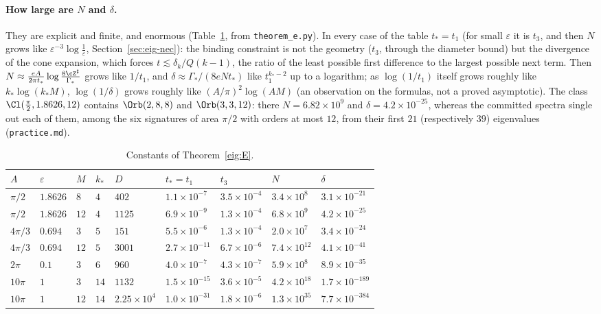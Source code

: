 \paragraph{How large are $N$ and $\delta$.} They are explicit and finite, and enormous (Table~\ref{eig:tab:E}, from \texttt{theorem\_e.py}). In every case of the table $t_*=t_1$ (for small $\varepsilon$ it is $t_3$, and then $N$ grows like $\varepsilon^{-3}\log\frac1\varepsilon$, Section~\ref{sec:eig-nec}): the binding constraint is not the geometry ($t_3$, through the diameter bound) but the divergence of the cone expansion, which forces $t\lesssim\delta_k/Q(k-1)$, the ratio of the least possible first difference to the largest possible next term. Then $N\approx\frac{eA}{2\pi t_*}\log\frac{8\cZ^\sharp}{\Gamma_*}$ grows like $1/t_1$, and $\delta\approx\Gamma_*/(8eNt_*)$ like $t_1^{k_*-2}$ up to a logarithm; as $\log(1/t_1)$ itself grows roughly like $k_*\log(k_*M)$, $\log(1/\delta)$ grows roughly like $(A/\pi)^2\log(AM)$ (an observation on the formulas, not a proved asymptotic). The class $\Cl(\frac\pi2,1.8626,12)$ contains $\Orb(2,8,8)$ and $\Orb(3,3,12)$: there $N=6.82\times10^9$ and $\delta=4.2\times10^{-25}$, whereas the committed spectra single out each of them, among the six signatures of area $\pi/2$ with orders at most $12$, from their first $21$ (respectively $39$) eigenvalues (\texttt{practice.md}).

\begin{table}[h]
\centering\footnotesize
\caption{Constants of Theorem~\ref{eig:E}.}\label{eig:tab:E}
\begin{tabular}{@{}lllllllll@{}}
\toprule
$A$ & $\varepsilon$ & $M$ & $k_*$ & $D$ & $t_*=t_1$ & $t_3$ & $N$ & $\delta$\\
\midrule
$\pi/2$ & $1.8626$ & $8$ & $4$ & $402$ & $1.1\times10^{-7}$ & $3.5\times10^{-4}$ & $3.4\times10^{8}$ & $3.1\times10^{-21}$\\
$\pi/2$ & $1.8626$ & $12$ & $4$ & $1125$ & $6.9\times10^{-9}$ & $1.3\times10^{-4}$ & $6.8\times10^{9}$ & $4.2\times10^{-25}$\\
$4\pi/3$ & $0.694$ & $3$ & $5$ & $151$ & $5.5\times10^{-6}$ & $1.3\times10^{-4}$ & $2.0\times10^{7}$ & $3.4\times10^{-24}$\\
$4\pi/3$ & $0.694$ & $12$ & $5$ & $3001$ & $2.7\times10^{-11}$ & $6.7\times10^{-6}$ & $7.4\times10^{12}$ & $4.1\times10^{-41}$\\
$2\pi$ & $0.1$ & $3$ & $6$ & $960$ & $4.0\times10^{-7}$ & $4.3\times10^{-7}$ & $5.9\times10^{8}$ & $8.9\times10^{-35}$\\
$10\pi$ & $1$ & $3$ & $14$ & $1132$ & $1.5\times10^{-15}$ & $3.6\times10^{-5}$ & $4.2\times10^{18}$ & $1.7\times10^{-189}$\\
$10\pi$ & $1$ & $12$ & $14$ & $2.25\times10^4$ & $1.0\times10^{-31}$ & $1.8\times10^{-6}$ & $1.3\times10^{35}$ & $7.7\times10^{-384}$\\
\bottomrule
\end{tabular}
\end{table}

